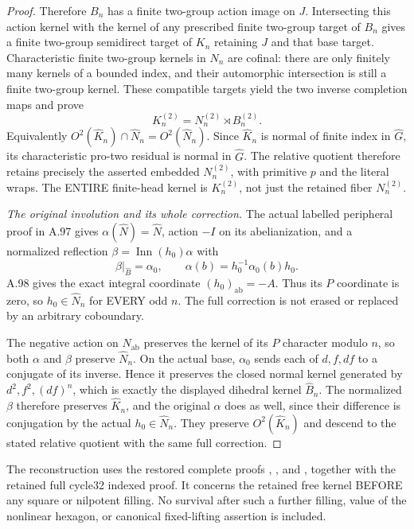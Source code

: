 \begin{proof}
Therefore $B_n$ has a finite two-group action image on $J$.
Intersecting this action kernel with the kernel of any prescribed
finite two-group target of $B_n$ gives a finite two-group
semidirect target of $K_n$ retaining $J$ and that base target.
Characteristic finite two-group kernels in $N_n$ are cofinal:
there are only finitely many kernels of a bounded index, and their
automorphic intersection is still a finite two-group kernel.
These compatible targets yield the two inverse completion maps and
prove
\[
 K_n^{(2)}=N_n^{(2)}\rtimes B_n^{(2)}.
\]
Equivalently $O^2(\widehat K_n)\cap\widehat N_n=O^2(\widehat N_n)$.
Since $\widehat K_n$ is normal of finite index in $\widehat G$, its
characteristic pro-two residual is normal in $\widehat G$.
The relative quotient therefore retains precisely the asserted
embedded $N_n^{(2)}$, with primitive $p$ and the literal wraps.
The ENTIRE finite-head kernel is $K_n^{(2)}$, not just the retained
fiber $N_n^{(2)}$.

\emph{The original involution and its whole correction.}
The actual labelled peripheral proof in A.97 gives
$\alpha(\widehat N)=\widehat N$, action $-I$ on its abelianization,
and a normalized reflection
$\beta=\operatorname{Inn}(h_0)\alpha$ with
\[
 \beta|_{\widehat B}=\alpha_0,\qquad
 \alpha(b)=h_0^{-1}\alpha_0(b)h_0 .
\]
A.98 gives the exact integral coordinate
$(h_0)_{\mathrm{ab}}=-A$. Thus its $P$ coordinate is zero, so
$h_0\in\widehat N_n$ for EVERY odd $n$. The full correction is not
erased or replaced by an arbitrary coboundary.

The negative action on $N_{\mathrm{ab}}$ preserves the kernel of its
$P$ character modulo $n$, so both $\alpha$ and $\beta$ preserve
$\widehat N_n$. On the actual base, $\alpha_0$ sends each of
$d,f,df$ to a conjugate of its inverse. Hence it preserves the closed
normal kernel generated by $d^2,f^2,(df)^n$, which is exactly the
displayed dihedral kernel $\widehat B_n$. The normalized $\beta$
therefore preserves $\widehat K_n$, and the original $\alpha$ does
as well, since their difference is conjugation by the actual
$h_0\in\widehat N_n$. They preserve $O^2(\widehat K_n)$ and descend
to the stated relative quotient with the same full correction.
\end{proof}
The reconstruction uses the restored complete proofs
,
, and
, together with
the retained full cycle32 indexed proof. It concerns the retained
free kernel BEFORE any square or nilpotent filling. No survival
after such a further filling, value of the nonlinear hexagon, or
canonical fixed-lifting assertion is included.
